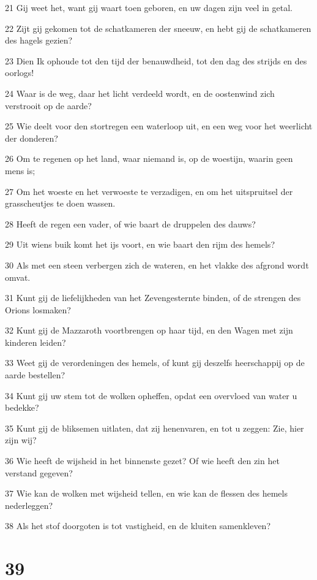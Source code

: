\par 21 Gij weet het, want gij waart toen geboren, en uw dagen zijn veel in getal.
\par 22 Zijt gij gekomen tot de schatkameren der sneeuw, en hebt gij de schatkameren des hagels gezien?
\par 23 Dien Ik ophoude tot den tijd der benauwdheid, tot den dag des strijds en des oorlogs!
\par 24 Waar is de weg, daar het licht verdeeld wordt, en de oostenwind zich verstrooit op de aarde?
\par 25 Wie deelt voor den stortregen een waterloop uit, en een weg voor het weerlicht der donderen?
\par 26 Om te regenen op het land, waar niemand is, op de woestijn, waarin geen mens is;
\par 27 Om het woeste en het verwoeste te verzadigen, en om het uitspruitsel der grasscheutjes te doen wassen.
\par 28 Heeft de regen een vader, of wie baart de druppelen des dauws?
\par 29 Uit wiens buik komt het ijs voort, en wie baart den rijm des hemels?
\par 30 Als met een steen verbergen zich de wateren, en het vlakke des afgrond wordt omvat.
\par 31 Kunt gij de liefelijkheden van het Zevengesternte binden, of de strengen des Orions losmaken?
\par 32 Kunt gij de Mazzaroth voortbrengen op haar tijd, en den Wagen met zijn kinderen leiden?
\par 33 Weet gij de verordeningen des hemels, of kunt gij deszelfs heerschappij op de aarde bestellen?
\par 34 Kunt gij uw stem tot de wolken opheffen, opdat een overvloed van water u bedekke?
\par 35 Kunt gij de bliksemen uitlaten, dat zij henenvaren, en tot u zeggen: Zie, hier zijn wij?
\par 36 Wie heeft de wijsheid in het binnenste gezet? Of wie heeft den zin het verstand gegeven?
\par 37 Wie kan de wolken met wijsheid tellen, en wie kan de flessen des hemels nederleggen?
\par 38 Als het stof doorgoten is tot vastigheid, en de kluiten samenkleven?

\chapter{39}

